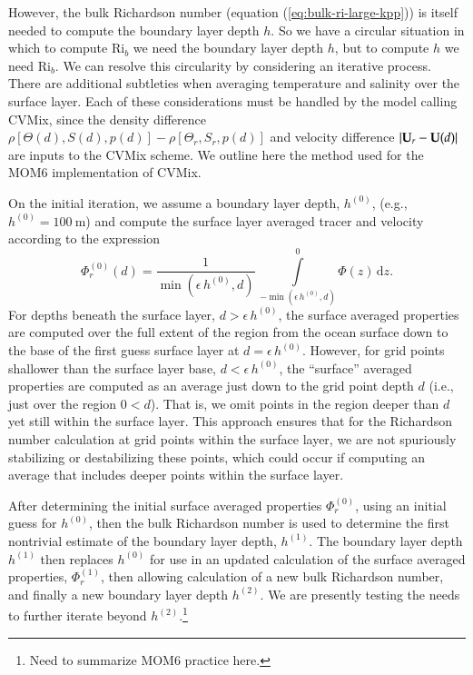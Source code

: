 However, the bulk Richardson number (equation
(\ref{eq:bulk-ri-large-kpp})) is itself needed to compute the boundary
layer depth $h$.  So we have a circular situation in which to compute
$\mbox{Ri}_{b}$ we need the boundary layer depth $h$, but to compute
$h$ we need $\mbox{Ri}_{b}$.  We can resolve this circularity by
considering an iterative process.  There are additional subtleties
when averaging temperature and salinity over the surface layer.  Each
of these considerations must be handled by the model calling CVMix,
since the density difference $\rho[\Theta(d), S(d), p(d)] -
\rho[\Theta_{r}, S_{r}, p(d)]$ and velocity difference $|{\bf U}_{r} -
{\bf U}(d)|$ are inputs to the CVMix scheme.  We outline here the
method used for the MOM6 implementation of CVMix.

On the initial iteration, we assume a boundary layer depth, $h^{(0)}$,
(e.g., $h^{(0)} = 100~\mbox{m}$) and compute the surface layer
averaged tracer and velocity according to the expression
\begin{equation}
   \Phi^{(0)}_{r}(d) = \frac{1}{\min(\epsilon \, h^{(0)}, d)} \, \int\limits^{0}_{-\min(\epsilon \, h^{(0)}, d)} \Phi(z) \, \mathrm{d}z.
\label{eq:surface-averaging}
\end{equation}
For depths beneath the surface layer, $d > \epsilon \, h^{(0)}$, the
surface averaged properties are computed over the full extent of the
region from the ocean surface down to the base of the first guess
surface layer at $d= \epsilon \, h^{(0)}$. However, for grid points
shallower than the surface layer base, $d < \epsilon \, h^{(0)}$, the
``surface'' averaged properties are computed as an average just down
to the grid point depth $d$ (i.e., just over the region $0 < d$).
That is, we omit points in the region deeper than $d$ yet still within
the surface layer.  This approach ensures that for the Richardson
number calculation at grid points within the surface layer, we are not
spuriously stabilizing or destabilizing these points, which could
occur if computing an average that includes deeper points within the
surface layer.

After determining the initial surface averaged properties
$\Phi^{(0)}_{r}$, using an initial guess for $h^{(0)}$, then the bulk
Richardson number is used to determine the first nontrivial estimate
of the boundary layer depth, $h^{(1)}$.  The boundary layer depth
$h^{(1)}$ then replaces $h^{(0)}$ for use in an updated calculation of
the surface averaged properties, $\Phi^{(1)}_{r}$, then allowing
calculation of a new bulk Richardson number, and finally a new
boundary layer depth $h^{(2)}$.  We are presently testing the needs to
further iterate beyond $h^{(2)}$.\footnote{\color{red} Need to
  summarize MOM6 practice here. \color{black}}



